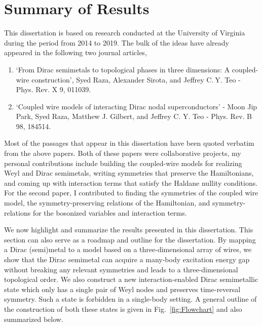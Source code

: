 \chapter{Summary of Results}\label{chap:Summary}

This dissertation is based on research conducted at the University of Virginia during the period from 2014 to 2019. The bulk of the ideas have already appeared in the following two journal articles,

\begin{enumerate}
	\item `From Dirac semimetals to topological phases in three dimensions: A coupled-wire construction', Syed Raza, Alexander Sirota, and Jeffrey C. Y. Teo - Phys. Rev. X 9, 011039. \cite{RazaSirotaTeo2019}
	\item `Coupled wire models of interacting Dirac nodal superconductors' - Moon Jip Park, Syed Raza, Matthew J. Gilbert, and Jeffrey C. Y. Teo - Phys. Rev. B 98, 184514. \cite{ParkRazaGilbertTeo2018}
\end{enumerate}

Most of the passages that appear in this dissertation have been quoted verbatim from the above papers. Both of these papers were collaborative projects, my personal contributions include building the coupled-wire models for realizing Weyl and Dirac semimetals, writing symmetries that preserve the Hamiltonians, and coming up with interaction terms that satisfy the Haldane nullity conditions. For the second paper, I contributed to finding the symmetries of the coupled wire model, the symmetry-preserving relations of the Hamiltonian, and symmetry-relations for the bosonized variables and interaction terms. 

We now highlight and summarize the results presented in this dissertation. This section can also serve as a roadmap and outline for the dissertation. By mapping a Dirac (semi)metal to a model based on a three-dimensional array of wires, we show that the Dirac semimetal can acquire a many-body excitation energy gap without breaking any relevant  symmetries and leads to a three-dimensional topological order. We also construct a new interaction-enabled Dirac semimetallic state which only has a single pair of Weyl nodes and preserves time-reversal symmetry. Such a state is forbidden in a single-body setting. A general outline of the construction of both these states is given in Fig.~\ref{fig:Flowchart} and also summarized below. 

